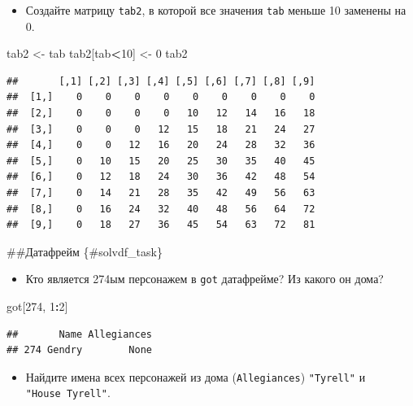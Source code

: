\documentclass[]{book}
\newenvironment{Shaded}{\begin{snugshade}}{\end{snugshade}}
\newcommand{\DecValTok}[1]{\textcolor[rgb]{0.00,0.00,0.81}{#1}}
\newcommand{\NormalTok}[1]{#1}
\newcommand{\OperatorTok}[1]{\textcolor[rgb]{0.81,0.36,0.00}{\textbf{#1}}}
\newcommand{\StringTok}[1]{\textcolor[rgb]{0.31,0.60,0.02}{#1}}
\providecommand{\tightlist}{%
  \setlength{\itemsep}{0pt}\setlength{\parskip}{0pt}}
\begin{document}
\begin{itemize}
\tightlist
\item
  Создайте матрицу \texttt{tab2}, в которой все значения \texttt{tab} меньше 10 заменены на 0.
\end{itemize}

\begin{Shaded}
\begin{Highlighting}[]
\NormalTok{tab2 <-}\StringTok{ }\NormalTok{tab}
\NormalTok{tab2[tab}\OperatorTok{<}\DecValTok{10}\NormalTok{] <-}\StringTok{ }\DecValTok{0}
\NormalTok{tab2}
\end{Highlighting}
\end{Shaded}

\begin{verbatim}
##       [,1] [,2] [,3] [,4] [,5] [,6] [,7] [,8] [,9]
##  [1,]    0    0    0    0    0    0    0    0    0
##  [2,]    0    0    0    0   10   12   14   16   18
##  [3,]    0    0    0   12   15   18   21   24   27
##  [4,]    0    0   12   16   20   24   28   32   36
##  [5,]    0   10   15   20   25   30   35   40   45
##  [6,]    0   12   18   24   30   36   42   48   54
##  [7,]    0   14   21   28   35   42   49   56   63
##  [8,]    0   16   24   32   40   48   56   64   72
##  [9,]    0   18   27   36   45   54   63   72   81
\end{verbatim}

\#\#Датафрейм \{\#solvdf\_task\}

\begin{itemize}
\tightlist
\item
  Кто является 274ым персонажем в \texttt{got} датафрейме? Из какого он дома?
\end{itemize}

\begin{Shaded}
\begin{Highlighting}[]
\NormalTok{got[}\DecValTok{274}\NormalTok{, }\DecValTok{1}\OperatorTok{:}\DecValTok{2}\NormalTok{]}
\end{Highlighting}
\end{Shaded}

\begin{verbatim}
##       Name Allegiances
## 274 Gendry        None
\end{verbatim}

\begin{itemize}
\tightlist
\item
  Найдите имена всех персонажей из дома (\texttt{Allegiances}) \texttt{"Tyrell"} и \texttt{"House\ Tyrell"}.
\end{itemize}
\end{document}
